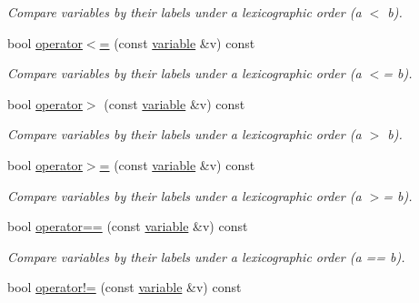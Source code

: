 \begin{DoxyCompactItemize}
\begin{DoxyCompactList}\small\item\em Compare variables by their labels under a lexicographic order (a $<$ b). \end{DoxyCompactList}\item 
\hypertarget{classmerlin_1_1variable_a438df3609f56198ebbc45f60c81dea2e}{}bool \hyperlink{classmerlin_1_1variable_a438df3609f56198ebbc45f60c81dea2e}{operator$<$=} (const \hyperlink{classmerlin_1_1variable}{variable} \&v) const \label{classmerlin_1_1variable_a438df3609f56198ebbc45f60c81dea2e}

\begin{DoxyCompactList}\small\item\em Compare variables by their labels under a lexicographic order (a $<$= b). \end{DoxyCompactList}\item 
\hypertarget{classmerlin_1_1variable_a27051e2d5711d2a7ad0533553e28f4c8}{}bool \hyperlink{classmerlin_1_1variable_a27051e2d5711d2a7ad0533553e28f4c8}{operator$>$} (const \hyperlink{classmerlin_1_1variable}{variable} \&v) const \label{classmerlin_1_1variable_a27051e2d5711d2a7ad0533553e28f4c8}

\begin{DoxyCompactList}\small\item\em Compare variables by their labels under a lexicographic order (a $>$ b). \end{DoxyCompactList}\item 
\hypertarget{classmerlin_1_1variable_ad50c1f02bd8af93aa4e61835639ae016}{}bool \hyperlink{classmerlin_1_1variable_ad50c1f02bd8af93aa4e61835639ae016}{operator$>$=} (const \hyperlink{classmerlin_1_1variable}{variable} \&v) const \label{classmerlin_1_1variable_ad50c1f02bd8af93aa4e61835639ae016}

\begin{DoxyCompactList}\small\item\em Compare variables by their labels under a lexicographic order (a $>$= b). \end{DoxyCompactList}\item 
\hypertarget{classmerlin_1_1variable_a5ee4c8e111df2c32f019e972875af434}{}bool \hyperlink{classmerlin_1_1variable_a5ee4c8e111df2c32f019e972875af434}{operator==} (const \hyperlink{classmerlin_1_1variable}{variable} \&v) const \label{classmerlin_1_1variable_a5ee4c8e111df2c32f019e972875af434}

\begin{DoxyCompactList}\small\item\em Compare variables by their labels under a lexicographic order (a == b). \end{DoxyCompactList}\item 
\hypertarget{classmerlin_1_1variable_a935984b9d304974df224cf5dc825438e}{}bool \hyperlink{classmerlin_1_1variable_a935984b9d304974df224cf5dc825438e}{operator!=} (const \hyperlink{classmerlin_1_1variable}{variable} \&v) const \label{classmerlin_1_1variable_a935984b9d304974df224cf5dc825438e}


\end{DoxyCompactItemize}
